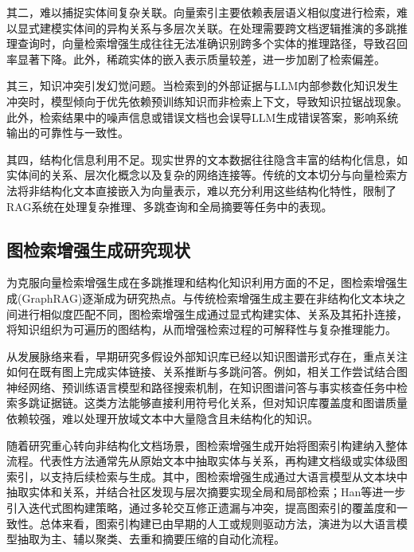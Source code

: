 \documentclass[promaster, vlined]{DissertUESTC}
\begin{document}
其二，难以捕捉实体间复杂关联。向量索引主要依赖表层语义相似度进行检索，难以显式建模实体间的异构关系与多层次关联\cite{han2025rag}。在处理需要跨文档逻辑推演的多跳推理查询时，向量检索增强生成往往无法准确识别跨多个实体的推理路径，导致召回率显著下降。此外，稀疏实体的嵌入表示质量较差，进一步加剧了检索偏差。

其三，知识冲突引发幻觉问题。当检索到的外部证据与LLM内部参数化知识发生冲突时，模型倾向于优先依赖预训练知识而非检索上下文，导致知识拉锯战现象\cite{grattafiori2024llama3herdmodels}。此外，检索结果中的噪声信息或错误文档也会误导LLM生成错误答案，影响系统输出的可靠性与一致性。

其四，结构化信息利用不足。现实世界的文本数据往往隐含丰富的结构化信息，如实体间的关系、层次化概念以及复杂的网络连接等。传统的文本切分与向量检索方法将非结构化文本直接嵌入为向量表示，难以充分利用这些结构化特性，限制了RAG系统在处理复杂推理、多跳查询和全局摘要等任务中的表现\cite{han2025rag}。

\subsection{图检索增强生成研究现状}

为克服向量检索增强生成在多跳推理和结构化知识利用方面的不足，图检索增强生成(GraphRAG)逐渐成为研究热点。与传统检索增强生成主要在非结构化文本块之间进行相似度匹配不同，图检索增强生成通过显式构建实体、关系及其拓扑连接，将知识组织为可遍历的图结构，从而增强检索过程的可解释性与复杂推理能力\cite{xia2021graph,han2024retrieval,peng2025graph}。

从发展脉络来看，早期研究多假设外部知识库已经以知识图谱形式存在，重点关注如何在既有图上完成实体链接、关系推断与多跳问答。例如，相关工作尝试结合图神经网络、预训练语言模型和路径搜索机制，在知识图谱问答与事实核查任务中检索多跳证据链\cite{tian2024graph,yasunaga2021qa,kim2023factkg}。这类方法能够直接利用符号化关系，但对知识库覆盖度和图谱质量依赖较强，难以处理开放域文本中大量隐含且未结构化的知识。

随着研究重心转向非结构化文档场景，图检索增强生成开始将图索引构建纳入整体流程。代表性方法通常先从原始文本中抽取实体与关系，再构建文档级或实体级图索引，以支持后续检索与生成\cite{dong2024survey,edge2024local,chen2023autokg}。其中，图检索增强生成\cite{edge2024local}通过大语言模型从文本块中抽取实体和关系，并结合社区发现与层次摘要实现全局和局部检索；Han等\cite{han2025reasoning}进一步引入迭代式图构建策略，通过多轮交互修正遗漏与冲突，提高图索引的覆盖度和一致性。总体来看，图索引构建已由早期的人工或规则驱动方法，演进为以大语言模型抽取为主、辅以聚类、去重和摘要压缩的自动化流程。
\end{document}
